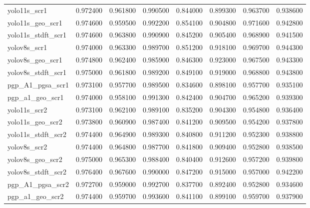 \begin{table}
\begin{tabular}{lrrrrrrr}
yolo11s_scr1 & 0.972400 & 0.961800 & 0.990500 & 0.844000 & 0.899300 & 0.963700 & 0.938600 \\
yolo11s_geo_scr1 & 0.974600 & 0.959500 & 0.992200 & 0.854100 & 0.904800 & 0.971600 & 0.942800 \\
yolo11s_stdft_scr1 & 0.974600 & 0.963800 & 0.990900 & 0.845200 & 0.905400 & 0.968900 & 0.941500 \\
yolov8s_scr1 & 0.974000 & 0.963300 & 0.989700 & 0.851200 & 0.918100 & 0.969700 & 0.944300 \\
yolov8s_geo_scr1 & 0.974800 & 0.962400 & 0.985900 & 0.846300 & 0.923000 & 0.967500 & 0.943300 \\
yolov8s_stdft_scr1 & 0.975000 & 0.961800 & 0.989200 & 0.849100 & 0.919000 & 0.968800 & 0.943800 \\
pgp_A1_pgsa_scr1 & 0.973100 & 0.957700 & 0.989500 & 0.834600 & 0.898100 & 0.957700 & 0.935100 \\
pgp_a1_geo_scr1 & 0.974000 & 0.958100 & 0.991300 & 0.842400 & 0.904700 & 0.965200 & 0.939300 \\
yolo11s_scr2 & 0.973100 & 0.962100 & 0.989100 & 0.835200 & 0.904300 & 0.954800 & 0.936400 \\
yolo11s_geo_scr2 & 0.973800 & 0.960900 & 0.987400 & 0.841200 & 0.909500 & 0.954200 & 0.937800 \\
yolo11s_stdft_scr2 & 0.974400 & 0.964900 & 0.989300 & 0.840800 & 0.911200 & 0.952300 & 0.938800 \\
yolov8s_scr2 & 0.974400 & 0.964800 & 0.987700 & 0.841800 & 0.909400 & 0.952800 & 0.938500 \\
yolov8s_geo_scr2 & 0.975000 & 0.965300 & 0.988400 & 0.840400 & 0.912600 & 0.957200 & 0.939800 \\
yolov8s_stdft_scr2 & 0.976400 & 0.967600 & 0.990000 & 0.847200 & 0.915000 & 0.957000 & 0.942200 \\
pgp_A1_pgsa_scr2 & 0.972700 & 0.959000 & 0.992700 & 0.837700 & 0.892400 & 0.952800 & 0.934600 \\
pgp_a1_geo_scr2 & 0.974400 & 0.959700 & 0.993600 & 0.841100 & 0.899100 & 0.959700 & 0.937900 \\
\bottomrule
\end{tabular}
\end{table}
